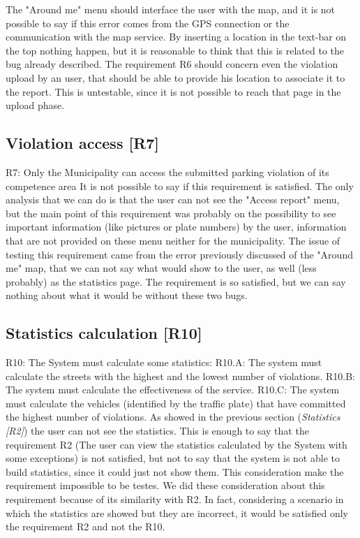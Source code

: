 \documentclass[../ATD.tex]{subfiles}
\begin{document}
    The "Around me" menu should interface the user with the map, and it is not possible to say if this error comes from the GPS connection or the communication with the map service.
    By inserting a location in the text-bar on the top nothing happen, but it is reasonable to think that this is related to the bug already described.
    \newline
    The requirement R6 should concern even the violation upload by an user, that should be able to provide his location to associate it to the report.
    This is untestable, since it is not possible to reach that page in the upload phase.

    \subsection{Violation access [R7]}\label{subsec:violation-access}
    R7: Only the Municipality can access the submitted parking violation of its competence area
    \newline
    It is not possible to say if this requirement is satisfied.
    The only analysis that we can do is that the user can not see the "Access report" menu, but the main point of this requirement was probably on the possibility to see important information (like pictures or plate numbers) by the user, information that are not provided on these menu neither for the municipality.
    The issue of testing this requirement came from the error previously discussed of the "Around me" map, that we can not say what would show to the user, as well (less probably) as the statistics page.
    The requirement is so satisfied, but we can say nothing about what it would be without these two bugs.

    \subsection{Statistics calculation [R10]}\label{subsec:statistics-calculation}
    R10: The System must calculate some statistics:
    \newline
    R10.A: The system must calculate the streets with the highest and the lowest number of violations.
    \newline
    R10.B: The system must calculate the effectiveness of the service.
    \newline
    R10.C: The system must calculate the vehicles (identified by the traffic plate) that have committed the highest number of violations.
    \newline
    As showed in the previous section (\textit{Statistics [R2]}) the user can not see the statistics.
    This is enough to say that the requirement R2 (The user can view the statistics calculated by the System with some exceptions) is not satisfied, but not to say that the system is not able to build statistics, since it could just not show them.
    This consideration make the requirement impossible to be testes.
    \newline
    We did these consideration about this requirement because of its similarity with R2.
    In fact, considering a scenario in which the statistics are showed but they are incorrect, it would be satisfied only the requirement R2 and not the R10.
    
\end{document}
